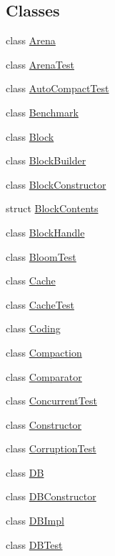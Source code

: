 \subsection*{Classes}
\begin{DoxyCompactItemize}
\item 
class \hyperlink{classleveldb_1_1_arena}{Arena}
\item 
class \hyperlink{classleveldb_1_1_arena_test}{Arena\+Test}
\item 
class \hyperlink{classleveldb_1_1_auto_compact_test}{Auto\+Compact\+Test}
\item 
class \hyperlink{classleveldb_1_1_benchmark}{Benchmark}
\item 
class \hyperlink{classleveldb_1_1_block}{Block}
\item 
class \hyperlink{classleveldb_1_1_block_builder}{Block\+Builder}
\item 
class \hyperlink{classleveldb_1_1_block_constructor}{Block\+Constructor}
\item 
struct \hyperlink{structleveldb_1_1_block_contents}{Block\+Contents}
\item 
class \hyperlink{classleveldb_1_1_block_handle}{Block\+Handle}
\item 
class \hyperlink{classleveldb_1_1_bloom_test}{Bloom\+Test}
\item 
class \hyperlink{classleveldb_1_1_cache}{Cache}
\item 
class \hyperlink{classleveldb_1_1_cache_test}{Cache\+Test}
\item 
class \hyperlink{classleveldb_1_1_coding}{Coding}
\item 
class \hyperlink{classleveldb_1_1_compaction}{Compaction}
\item 
class \hyperlink{structleveldb_1_1_comparator}{Comparator}
\item 
class \hyperlink{classleveldb_1_1_concurrent_test}{Concurrent\+Test}
\item 
class \hyperlink{classleveldb_1_1_constructor}{Constructor}
\item 
class \hyperlink{classleveldb_1_1_corruption_test}{Corruption\+Test}
\item 
class \hyperlink{classleveldb_1_1_d_b}{D\+B}
\item 
class \hyperlink{classleveldb_1_1_d_b_constructor}{D\+B\+Constructor}
\item 
class \hyperlink{classleveldb_1_1_d_b_impl}{D\+B\+Impl}
\item 
class \hyperlink{classleveldb_1_1_d_b_test}{D\+B\+Test}
\item 

\end{DoxyCompactItemize}
